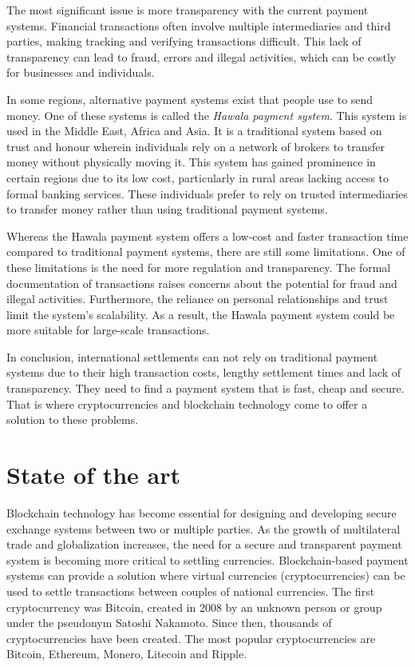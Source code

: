 The most significant issue is more transparency with the current payment systems. Financial transactions often involve multiple intermediaries
and third parties, making tracking and verifying transactions difficult. This lack of transparency can lead to fraud, errors and illegal activities, which can be
costly for businesses and individuals.


In some regions, alternative payment systems exist that people use to send money. One of these systems is called
the \textit{Hawala payment system}. This system is used in the Middle East, Africa and Asia. It is a traditional system based on
trust and honour wherein individuals rely on a network of brokers to transfer money without physically moving it. This system
has gained prominence in certain regions due to its low cost, particularly in rural areas lacking access to formal banking services.
These individuals prefer to rely on trusted intermediaries to transfer money rather than using traditional payment systems.


Whereas the Hawala payment system offers a low-cost and faster transaction time compared to traditional payment systems,
there are still some limitations. One of these limitations is the need for more regulation and transparency. The formal documentation of transactions
raises concerns about the potential for fraud and illegal activities. Furthermore, the reliance on personal relationships
and trust limit the system's scalability. As a result, the Hawala payment system could be more suitable for large-scale transactions.


In conclusion, international settlements can not rely on traditional payment systems due to their high transaction costs, lengthy settlement times and lack of transparency.
They need to find a payment system that is fast, cheap and secure. That is where cryptocurrencies and blockchain technology come to offer a solution to these problems.

\section{State of the art}
\label{sec:state_of_the_art}


Blockchain technology has become essential for designing and developing secure exchange systems between two or multiple parties.
As the growth of multilateral trade and globalization increases, the need for a secure and transparent payment system is becoming more critical to
settling currencies. Blockchain-based payment systems can provide a solution where virtual currencies (cryptocurrencies) can be used to settle transactions
between couples of national currencies. The first cryptocurrency was Bitcoin, created in 2008 \cite{online_satoshinakamoto} by an unknown person or group under the pseudonym Satoshi Nakamoto. Since then, thousands of
cryptocurrencies have been created. The most popular cryptocurrencies are Bitcoin, Ethereum, Monero, Litecoin and Ripple.


